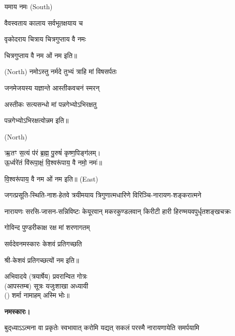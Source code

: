 यमाय नमः   {\scriptsize (South)}

{वैवस्वताय   कालाय   सर्वभूतक्षयाय   च}

{वृकोदराय   चित्राय   चित्रगुप्ताय   वै  नमः}

चित्रगुप्ताय   वै  नम ओं नम इति॥

 {\scriptsize (North)}
{नमोऽस्तु नर्मदे तुभ्यं त्राहि मां विषसर्पतः}

{जनमेजयस्य यज्ञान्ते आस्तीकवचनं स्मरन्}


{अस्तीकः सत्यसन्धो मां पन्नगेभ्योऽभिरक्षतु}

पन्नगेभ्योऽभिरक्षत्वोन्नम इति॥

 {\scriptsize (North)}

ऋ॒तꣳ स॒त्यं प॑रं ब्र॒ह्म॒ पु॒रुषं॑ कृष्ण॒पिङ्ग॑लम्।\\
ऊ॒र्ध्वरे॑तं वि॑रूपा॒क्षं॒ वि॒श्वरू॑पाय॒ वै नमो॒ नमः॑॥


वि॒श्वरू॑पाय॒ वै नम ओं नम इति॥
{\scriptsize (East)}

{जगत्प्रसूति-स्थिति-नाश-हेतवे}
{त्रयीमयाय त्रिगुणात्मधारिणे}
{विरिञ्चि-नारायण-शङ्करात्मने}

{नारायणः सरसि-जासन-सन्निविष्टः}
{केयूरवान् मकरकुण्डलवान् किरीटी}
{हारी हिरण्मयवपुर्धृतशङ्खचक्रः}

{गोविन्द पुण्डरीकाक्ष रक्ष मां शरणागतम्}

{सर्वदेवनमस्कारः केशवं प्रतिगच्छति}

श्री-केशवं प्रतिगच्छत्यों नम इति॥

अभिवादये \blank{} (त्रयार्षेय) प्रवरान्वित \blank{} गोत्रः\\
(आपस्तम्ब) सूत्रः यजुःशाखा अध्यायी\\
() शर्मा नामाहम् अस्मि भोः॥

\textbf{नमस्कारः।}

{बुद्‌ध्याऽऽत्मना वा प्रकृतेः स्वभावात्}
{करोमि यद्यत् सकलं परस्मै}
{नारायणायेति समर्पयामि}

